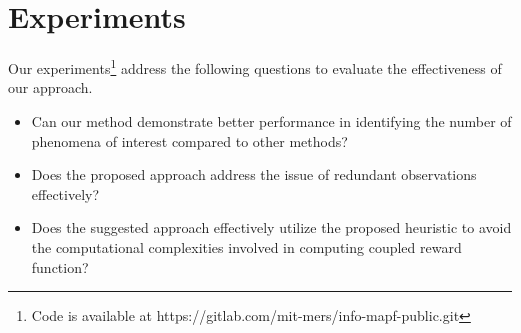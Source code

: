 \documentclass[letterpaper, 10 pt, conference]{IEEEConference}
\begin{document}



                    

\section{Experiments} \label{experiments}

Our experiments\footnote{Code is available at https://gitlab.com/mit-mers/info-mapf-public.git} address the following questions to evaluate the effectiveness of our approach. 

\begin{itemize}[noitemsep, align=left]
\item[\textbf{Q1:}] Can our method demonstrate better performance in identifying the number of phenomena of interest compared to other methods?
\item[\textbf{Q2:}] Does the proposed approach address the issue of redundant observations effectively?
\item[\textbf{Q3:}] Does the suggested approach effectively utilize the proposed heuristic to avoid the computational complexities involved in computing coupled reward function?
\end{itemize}
\end{document}
